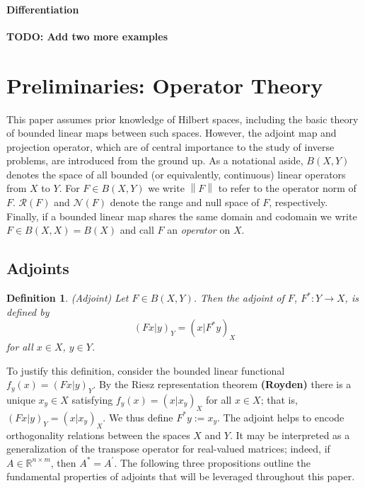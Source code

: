 \documentclass[12pt]{article}
\newcommand*{\norm}[1]{\left\lVert#1\right\rVert}
\newtheorem{definition}{Definition}
\begin{document}
  \paragraph*{Differentiation}
 
 \textbf{TODO: Add two more examples}
 
 \section{Preliminaries: Operator Theory} \label{preliminaries}
 This paper assumes prior knowledge of Hilbert spaces, including the basic theory of bounded 
 linear maps between such spaces. However, the adjoint map and projection operator, which are of central importance 
 to the study of inverse problems, are introduced from the ground up. As a notational aside, $B(X, Y)$ denotes the space of all bounded
 (or equivalently, continuous) linear operators from $X$ to $Y$. For $F \in B(X, Y)$ we write $\norm{F}$
 to refer to the operator norm of $F$. $\mathcal{R}(F)$ and $\mathcal{N}(F)$ denote the range and 
 null space of $F$, respectively. Finally, if a bounded linear map shares the same domain and codomain we write 
 $F \in B(X, X) = B(X)$ and call $F$ an \textit{operator} on $X$. 
  
\subsection{Adjoints}
 \begin{definition} 
 (Adjoint) Let $F \in B(X, Y)$. Then the adjoint of $F$, $F^*: Y \to X$, is defined by 
 	\begin{equation*} 
	(Fx|y)_Y = (x|F^*y)_X
 	\end{equation*} 
	for all $x \in X$, $y \in Y$. 
 \end{definition} 
To justify this definition, consider the bounded linear functional $f_y(x) = (Fx|y)_Y$. By the Riesz representation theorem \textbf{(Royden)}
there is a unique $x_y \in X$ satisfying $f_y(x) = (x|x_y)_X$ for all $x \in X$; that is, $(Fx|y)_Y = (x|x_y)_X$. 
We thus define $F^*y := x_y$. The adjoint helps to encode orthogonality relations between the spaces $X$ and $Y$. 
It may be interpreted as a generalization of the transpose operator for real-valued matrices; indeed, if $A \in \mathbb{R}^{n \times m}$, 
then $A^* = A^\prime$. The following three propositions outline the fundamental properties of adjoints that will be leveraged throughout
this paper. 
\end{document}

